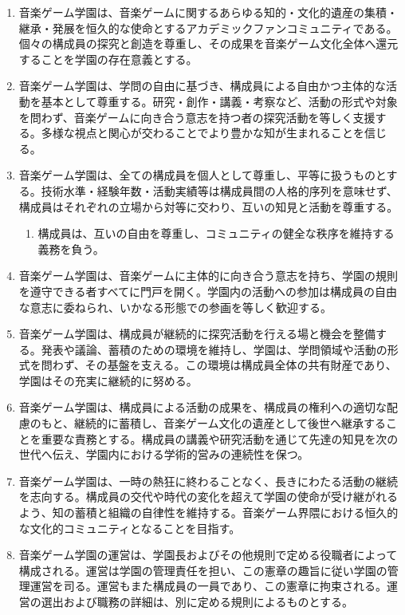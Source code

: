 \documentclass[
  report,
  fontsize   = 12pt,
  paper      = a4,
  head_space = 20mm,
  foot_space = 20mm,
  gutter     = 20mm,
  fore-edge  = 20mm
  ]{jlreq}
\begin{document}
\begin{enumerate}[label=第\arabic*条　]
  \item 音楽ゲーム学園は、音楽ゲームに関するあらゆる知的・文化的遺産の集積・継承・発展を恒久的な使命とするアカデミックファンコミュニティである。個々の構成員の探究と創造を尊重し、その成果を音楽ゲーム文化全体へ還元することを学園の存在意義とする。
  \item 音楽ゲーム学園は、学問の自由に基づき、構成員による自由かつ主体的な活動を基本として尊重する。研究・創作・講義・考察など、活動の形式や対象を問わず、音楽ゲームに向き合う意志を持つ者の探究活動を等しく支援する。多様な視点と関心が交わることでより豊かな知が生まれることを信じる。
  \item 音楽ゲーム学園は、全ての構成員を個人として尊重し、平等に扱うものとする。技術水準・経験年数・活動実績等は構成員間の人格的序列を意味せず、構成員はそれぞれの立場から対等に交わり、互いの知見と活動を尊重する。
    \begin{enumerate}[label=\arabic*　,start=2,leftmargin=*]
      \item 構成員は、互いの自由を尊重し、コミュニティの健全な秩序を維持する義務を負う。
    \end{enumerate}
  \item 音楽ゲーム学園は、音楽ゲームに主体的に向き合う意志を持ち、学園の規則を遵守できる者すべてに門戸を開く。学園内の活動への参加は構成員の自由な意志に委ねられ、いかなる形態での参画を等しく歓迎する。
  \item 音楽ゲーム学園は、構成員が継続的に探究活動を行える場と機会を整備する。発表や議論、蓄積のための環境を維持し、学園は、学問領域や活動の形式を問わず、その基盤を支える。この環境は構成員全体の共有財産であり、学園はその充実に継続的に努める。
  \item 音楽ゲーム学園は、構成員による活動の成果を、構成員の権利への適切な配慮のもと、継続的に蓄積し、音楽ゲーム文化の遺産として後世へ継承することを重要な責務とする。構成員の講義や研究活動を通じて先達の知見を次の世代へ伝え、学園内における学術的営みの連続性を保つ。
  \item 音楽ゲーム学園は、一時の熱狂に終わることなく、長きにわたる活動の継続を志向する。構成員の交代や時代の変化を超えて学園の使命が受け継がれるよう、知の蓄積と組織の自律性を維持する。音楽ゲーム界隈における恒久的な文化的コミュニティとなることを目指す。
  \item 音楽ゲーム学園の運営は、学園長およびその他規則で定める役職者によって構成される。運営は学園の管理責任を担い、この憲章の趣旨に従い学園の管理運営を司る。運営もまた構成員の一員であり、この憲章に拘束される。運営の選出および職務の詳細は、別に定める規則によるものとする。

\end{enumerate}
\end{document}
